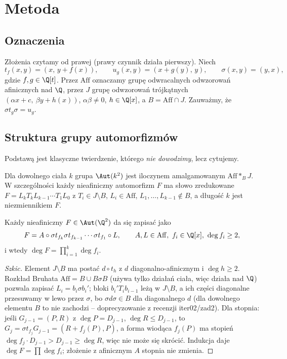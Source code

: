 \section{Metoda}

\subsection{Oznaczenia}
Złożenia czytamy od prawej (prawy czynnik działa pierwszy). Niech
\[
t_f(x,y)=(x,\,y+f(x)),\qquad u_g(x,y)=(x+g(y),\,y),\qquad \sigma(x,y)=(y,x),
\]
gdzie $f,g\in\Q[t]$. Przez $\mathrm{Aff}$ oznaczamy grupę odwracalnych odwzorowań afinicznych
nad $\Q$, przez $J$ grupę odwzorowań trójkątnych $(\alpha x+c,\ \beta y+h(x))$, $\alpha\beta\neq0$,
$h\in\Q[x]$, a $B=\mathrm{Aff}\cap J$. Zauważmy, że $\sigma t_g\sigma=u_g$.

\subsection{Struktura grupy automorfizmów}
Podstawą jest klasyczne twierdzenie, którego \emph{nie dowodzimy}, lecz cytujemy.

\begin{twierdzenie}\label{tw:jvdk}
Dla dowolnego ciała $k$ grupa $\Aut(k^2)$ jest iloczynem amalgamowanym
$\mathrm{Aff}*_B J$. W szczególności każdy nieafiniczny automorfizm $F$ ma słowo zredukowane
$F=L_kT_k L_{k-1}\cdots T_1L_0$ z $T_i\in J\setminus B$, $L_i\in\mathrm{Aff}$,
$L_1,\dots,L_{k-1}\notin B$, a długość $k$ jest niezmiennikiem $F$.
\end{twierdzenie}

\begin{lemat}\label{lem:postac}
Każdy nieafiniczny $F\in\Aut(\Q^2)$ da się zapisać jako
\[
F=A\circ\sigma t_{f_k}\sigma t_{f_{k-1}}\cdots\sigma t_{f_1}\circ L,\qquad A,L\in\mathrm{Aff},\ f_i\in\Q[x],\ \deg f_i\ge2,
\]
i wtedy $\deg F=\prod_{i=1}^k\deg f_i$.
\end{lemat}
\begin{proof}[Szkic]
Element $J\setminus B$ ma postać $d\circ t_h$ z $d$ diagonalno-afinicznym i $\deg h\ge2$.
Rozkład Bruhata $\mathrm{Aff}=B\cup B\sigma B$ (używa tylko działań ciała, więc działa nad $\Q$)
pozwala zapisać $L_i=b_i\sigma b_i'$; bloki $b_i'T_ib_{i-1}$ leżą w $J\setminus B$, a ich części
diagonalne przesuwamy w lewo przez $\sigma$, bo $\sigma d\sigma\in B$ dla diagonalnego $d$
(dla dowolnego elementu $B$ to nie zachodzi -- doprecyzowanie z recenzji iter02/zad2).
Dla stopnia: jeśli $G_{j-1}=(P,R)$ z $\deg P=D_{j-1}$, $\deg R\le D_{j-1}$, to
$G_j=\sigma t_{f_j}G_{j-1}=(R+f_j(P),P)$, a forma wiodąca $f_j(P)$ ma stopień
$\deg f_j\cdot D_{j-1}>D_{j-1}\ge\deg R$, więc nie może się skrócić. Indukcja daje
$\deg F=\prod\deg f_i$; złożenie z afinicznym $A$ stopnia nie zmienia.
\end{proof}

